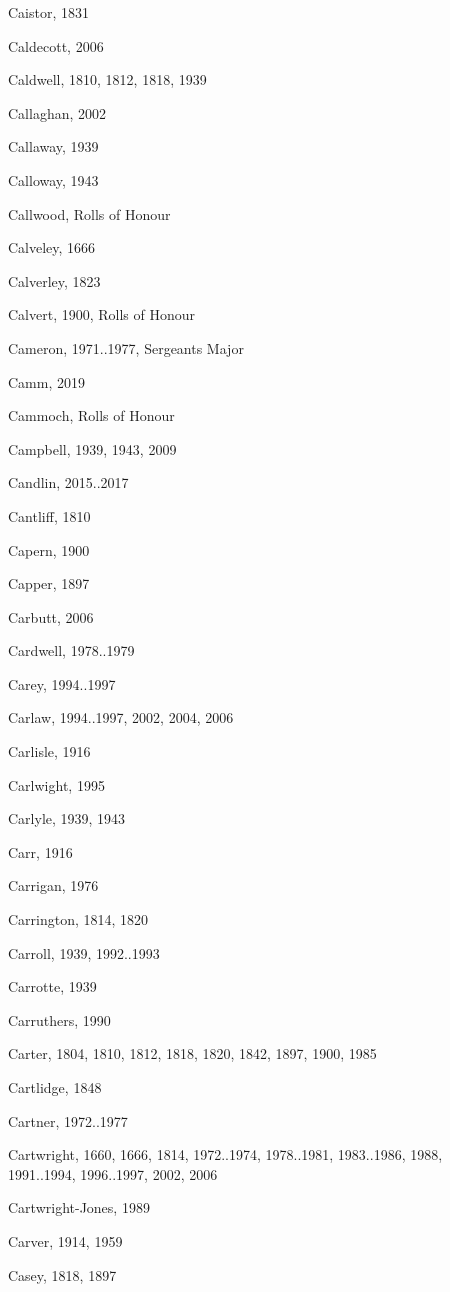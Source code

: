 {\begin{theindex}
\item Caistor, 1831
\item Caldecott, 2006
\item Caldwell, 1810, 1812, 1818, 1939
\item Callaghan, 2002
\item Callaway, 1939
\item Calloway, 1943
\item Callwood, Rolls of Honour
\item Calveley, 1666
\item Calverley, 1823
\item Calvert, 1900, Rolls of Honour
\item Cameron, 1971..1977, Sergeants Major
\item Camm, 2019
\item Cammoch, Rolls of Honour
\item Campbell, 1939, 1943, 2009
\item Candlin, 2015..2017
\item Cantliff, 1810
\item Capern, 1900
\item Capper, 1897
\item Carbutt, 2006
\item Cardwell, 1978..1979
\item Carey, 1994..1997
\item Carlaw, 1994..1997, 2002, 2004, 2006
\item Carlisle, 1916
\item Carlwight, 1995
\item Carlyle, 1939, 1943
\item Carr, 1916
\item Carrigan, 1976
\item Carrington, 1814, 1820
\item Carroll, 1939, 1992..1993
\item Carrotte, 1939
\item Carruthers, 1990
\item Carter, 1804, 1810, 1812, 1818, 1820, 1842, 1897, 1900, 1985
\item Cartlidge, 1848
\item Cartner, 1972..1977
\item Cartwright, 1660, 1666, 1814, 1972..1974, 1978..1981, 1983..1986, 1988, 1991..1994, 1996..1997, 2002, 2006
\item Cartwright-Jones, 1989
\item Carver, 1914, 1959
\item Casey, 1818, 1897

\end{theindex}}
